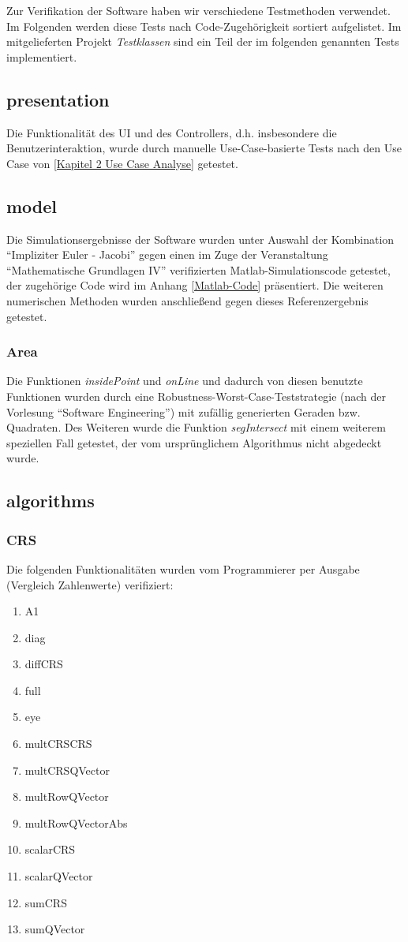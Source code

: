 Zur Verifikation der Software haben wir verschiedene Testmethoden verwendet. Im Folgenden werden diese Tests nach Code-Zugehörigkeit sortiert aufgelistet. Im mitgelieferten Projekt \emph{Testklassen} sind ein Teil der im folgenden genannten Tests implementiert.

\subsection{presentation}
Die Funktionalität des UI und des Controllers, d.h. insbesondere die Benutzerinteraktion, wurde durch manuelle Use-Case-basierte Tests nach den Use Case von \ref{Kapitel 2 Use Case Analyse} getestet. 

\subsection{model}
Die Simulationsergebnisse der Software wurden unter Auswahl der Kombination  "`Impliziter Euler - Jacobi"' gegen einen im Zuge der Veranstaltung "`Mathematische Grundlagen IV"' verifizierten Matlab-Simulationscode getestet, der zugehörige Code wird im Anhang \ref{Matlab-Code} präsentiert. Die weiteren numerischen Methoden wurden anschließend gegen dieses Referenzergebnis getestet.

\subsubsection{Area}
Die Funktionen \emph{insidePoint} und \emph{onLine} und dadurch von diesen benutzte Funktionen wurden durch eine Robustness-Worst-Case-Teststrategie (nach der Vorlesung "`Software Engineering"') mit zufällig generierten Geraden bzw. Quadraten. Des Weiteren wurde die Funktion \emph{segIntersect} mit einem weiterem speziellen Fall getestet, der vom ursprünglichem Algorithmus nicht abgedeckt wurde.

\subsection{algorithms}
\subsubsection{CRS}

Die folgenden Funktionalitäten wurden vom Programmierer per Ausgabe (Vergleich Zahlenwerte) verifiziert:
\begin{enumerate}
	\item A1
	\item diag
	\item diffCRS
	\item full
	\item eye
	\item multCRSCRS
	\item multCRSQVector
	\item multRowQVector
	\item multRowQVectorAbs
	\item scalarCRS
	\item scalarQVector
	\item sumCRS
	\item sumQVector
\end{enumerate}


